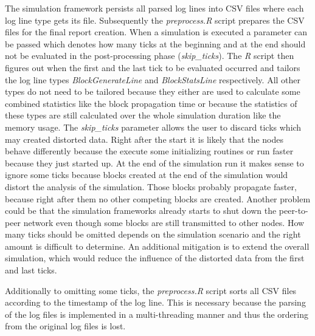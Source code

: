 The simulation framework persists all parsed log lines into CSV files where each log line type gets its file.
Subsequently the \textit{preprocess.R} script prepares the CSV files for the final report creation.
When a simulation is executed a parameter can be passed which denotes how many ticks at the beginning and at the end should not be evaluated in the post-processing phase (\textit{skip\_ticks}).
The \textit{R} script then figures out when the first and the last tick to be evaluated occurred and tailors the log line types \textit{BlockGenerateLine} and \textit{BlockStatsLine} respectively.
All other types do not need to be tailored because they either are used to calculate some combined statistics like the block propagation time or because the statistics of these types are still calculated over the whole simulation duration like the memory usage.
The \textit{skip\_ticks} parameter allows the user to discard ticks which may created distorted data.
Right after the start it is likely that the nodes behave differently because the execute some initializing routines or run faster because they just started up.
At the end of the simulation run it makes sense to ignore some ticks because blocks created at the end of the simulation would distort the analysis of the simulation.
Those blocks probably propagate faster, because right after them no other competing blocks are created.
Another problem could be that the simulation frameworks already starts to shut down the peer-to-peer network even though some blocks are still transmitted to other nodes.
How many ticks should be omitted depends on the simulation scenario and the right amount is difficult to determine.
An additional mitigation is to extend the overall simulation, which would reduce the influence of the distorted data from the first and last ticks.

Additionally to omitting some ticks, the \textit{preprocess.R} script sorts all CSV files according to the timestamp of the log line.
This is necessary because the parsing of the log files is implemented in a multi-threading manner and thus the ordering from the original log files is lost.

